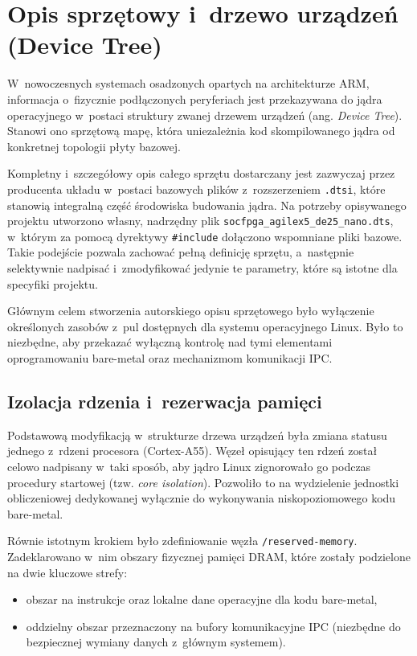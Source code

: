 \chapter{Opis sprzętowy i~drzewo urządzeń (Device Tree)}
\label{ch:sprzet_dtb}

W~nowoczesnych systemach osadzonych opartych na architekturze ARM, informacja o~fizycznie podłączonych peryferiach jest przekazywana do jądra operacyjnego w~postaci struktury zwanej drzewem urządzeń (ang. \textit{Device Tree}). Stanowi ono sprzętową mapę, która uniezależnia kod skompilowanego jądra od konkretnej topologii płyty bazowej.

Kompletny i~szczegółowy opis całego sprzętu dostarczany jest zazwyczaj przez producenta układu w~postaci bazowych plików z~rozszerzeniem \texttt{.dtsi}, które stanowią integralną część środowiska budowania jądra. Na potrzeby opisywanego projektu utworzono własny, nadrzędny plik \texttt{socfpga\_agilex5\_de25\_nano.dts}, w~którym za pomocą dyrektywy \texttt{\#include} dołączono wspomniane pliki bazowe. Takie podejście pozwala zachować pełną definicję sprzętu, a~następnie selektywnie nadpisać i~zmodyfikować jedynie te parametry, które są istotne dla specyfiki projektu.

Głównym celem stworzenia autorskiego opisu sprzętowego było wyłączenie określonych zasobów z~pul dostępnych dla systemu operacyjnego Linux. Było to niezbędne, aby przekazać wyłączną kontrolę nad tymi elementami oprogramowaniu bare-metal oraz mechanizmom komunikacji IPC.

\section{Izolacja rdzenia i~rezerwacja pamięci}
Podstawową modyfikacją w~strukturze drzewa urządzeń była zmiana statusu jednego z~rdzeni procesora (Cortex-A55). Węzeł opisujący ten rdzeń został celowo nadpisany w~taki sposób, aby jądro Linux zignorowało go podczas procedury startowej (tzw. \textit{core isolation}). Pozwoliło to na wydzielenie jednostki obliczeniowej dedykowanej wyłącznie do wykonywania niskopoziomowego kodu bare-metal.

Równie istotnym krokiem było zdefiniowanie węzła \texttt{/reserved-memory}. Zadeklarowano w~nim obszary fizycznej pamięci DRAM, które zostały podzielone na dwie kluczowe strefy:
\begin{itemize}
    \item obszar na instrukcje oraz lokalne dane operacyjne dla kodu bare-metal,
    \item oddzielny obszar przeznaczony na bufory komunikacyjne IPC (niezbędne do bezpiecznej wymiany danych z~głównym systemem).
\end{itemize}

